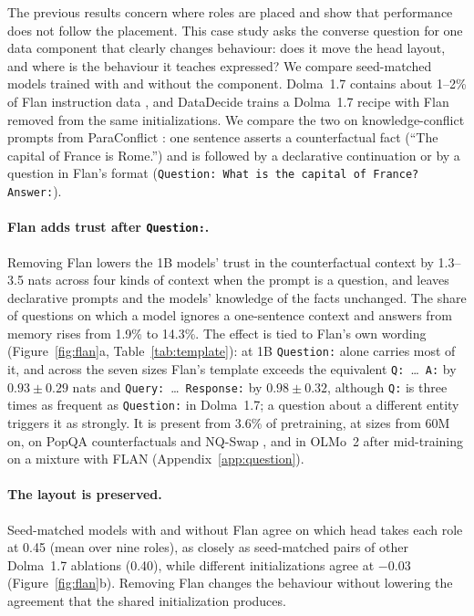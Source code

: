 \documentclass[11pt]{article}
\newcommand{\tmpl}[1]{\texttt{#1}}
\begin{document}
The previous results concern where roles are placed and show that performance does not follow the placement.
This case study asks the converse question for one data component that clearly changes behaviour: does it move the head layout, and where is the behaviour it teaches expressed?
We compare seed-matched models trained with and without the component.
Dolma~1.7 contains about 1--2\% of Flan instruction data \citep{longpre2023flan,soldaini2024dolma}, and DataDecide trains a Dolma~1.7 recipe with Flan removed from the same initializations.
We compare the two on knowledge-conflict prompts from ParaConflict \citep{li2025taming}: one sentence asserts a counterfactual fact (``The capital of France is Rome.'') and is followed by a declarative continuation or by a question in Flan's format (\tmpl{Question: What is the capital of France? Answer:}).

\paragraph{Flan adds trust after \tmpl{Question:}.}
Removing Flan lowers the 1B models' trust in the counterfactual context by 1.3--3.5 nats across four kinds of context when the prompt is a question, and leaves declarative prompts and the models' knowledge of the facts unchanged.
The share of questions on which a model ignores a one-sentence context and answers from memory rises from 1.9\% to 14.3\%.
The effect is tied to Flan's own wording (Figure~\ref{fig:flan}a, Table~\ref{tab:template}): at 1B \tmpl{Question:} alone carries most of it, and across the seven sizes Flan's template exceeds the equivalent \tmpl{Q:}~\dots~\tmpl{A:} by $0.93 \pm 0.29$ nats and \tmpl{Query:}~\dots~\tmpl{Response:} by $0.98 \pm 0.32$, although \tmpl{Q:} is three times as frequent as \tmpl{Question:} in Dolma~1.7; a question about a different entity triggers it as strongly.
It is present from 3.6\% of pretraining, at sizes from 60M on, on PopQA counterfactuals \citep{mallen2023popqa} and NQ-Swap \citep{longpre2021entity}, and in OLMo~2 \citep{olmo2024olmo2} after mid-training on a mixture with FLAN (Appendix~\ref{app:question}).

\paragraph{The layout is preserved.}
Seed-matched models with and without Flan agree on which head takes each role at 0.45 (mean over nine roles), as closely as seed-matched pairs of other Dolma~1.7 ablations (0.40), while different initializations agree at $-0.03$ (Figure~\ref{fig:flan}b).
Removing Flan changes the behaviour without lowering the agreement that the shared initialization produces.
\end{document}
